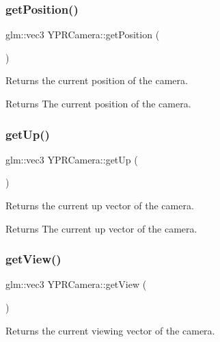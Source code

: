 \subsubsection{\texorpdfstring{get\+Position()}{getPosition()}}
{\footnotesize\ttfamily glm\+::vec3 Y\+P\+R\+Camera\+::get\+Position (\begin{DoxyParamCaption}{ }\end{DoxyParamCaption})}



Returns the current position of the camera. 

\begin{DoxyReturn}{Returns}
The current position of the camera. 
\end{DoxyReturn}
\mbox{\label{class_y_p_r_camera_a3441eafb88882eb670d7eeb8bdc433fc}} 
\subsubsection{\texorpdfstring{get\+Up()}{getUp()}}
{\footnotesize\ttfamily glm\+::vec3 Y\+P\+R\+Camera\+::get\+Up (\begin{DoxyParamCaption}{ }\end{DoxyParamCaption})}



Returns the current up vector of the camera. 

\begin{DoxyReturn}{Returns}
The current up vector of the camera. 
\end{DoxyReturn}
\mbox{\label{class_y_p_r_camera_ad30888384ec6b348403c85ad0aef83c9}} 
\subsubsection{\texorpdfstring{get\+View()}{getView()}}
{\footnotesize\ttfamily glm\+::vec3 Y\+P\+R\+Camera\+::get\+View (\begin{DoxyParamCaption}{ }\end{DoxyParamCaption})}



Returns the current viewing vector of the camera. 

